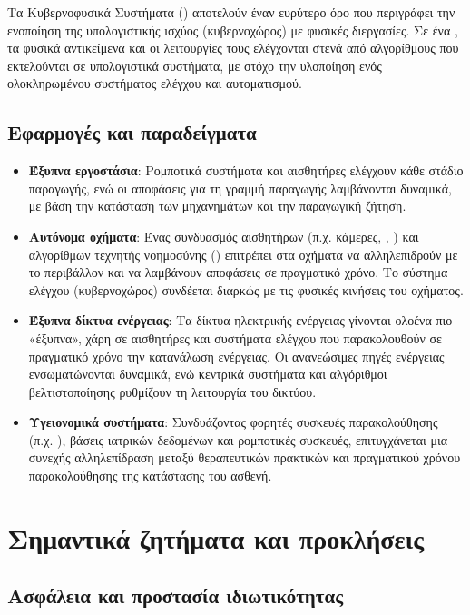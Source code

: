 Τα Κυβερνοφυσικά Συστήματα () αποτελούν έναν ευρύτερο όρο που περιγράφει την ενοποίηση της υπολογιστικής ισχύος (κυβερνοχώρος) με φυσικές διεργασίες. Σε ένα , τα φυσικά αντικείμενα και οι λειτουργίες τους ελέγχονται στενά από αλγορίθμους που εκτελούνται σε υπολογιστικά συστήματα, με στόχο την υλοποίηση ενός ολοκληρωμένου συστήματος ελέγχου και αυτοματισμού.

\subsection{Εφαρμογές και παραδείγματα }

\begin{itemize}
  \item \textbf{Έξυπνα εργοστάσια}: Ρομποτικά συστήματα και αισθητήρες ελέγχουν κάθε στάδιο παραγωγής, ενώ οι αποφάσεις για τη γραμμή παραγωγής λαμβάνονται δυναμικά, με βάση την κατάσταση των μηχανημάτων και την παραγωγική ζήτηση.
  \item \textbf{Αυτόνομα οχήματα}: Ένας συνδυασμός αισθητήρων (π.χ. κάμερες, , ) και αλγορίθμων τεχνητής νοημοσύνης () επιτρέπει στα οχήματα να αλληλεπιδρούν με το περιβάλλον και να λαμβάνουν αποφάσεις σε πραγματικό χρόνο. Το σύστημα ελέγχου (κυβερνοχώρος) συνδέεται διαρκώς με τις φυσικές κινήσεις του οχήματος.
  \item \textbf{Έξυπνα δίκτυα ενέργειας}: Τα δίκτυα ηλεκτρικής ενέργειας γίνονται ολοένα πιο «έξυπνα», χάρη σε αισθητήρες και συστήματα ελέγχου που παρακολουθούν σε πραγματικό χρόνο την κατανάλωση ενέργειας. Οι ανανεώσιμες πηγές ενέργειας ενσωματώνονται δυναμικά, ενώ κεντρικά συστήματα και αλγόριθμοι βελτιστοποίησης ρυθμίζουν τη λειτουργία του δικτύου.
  \item \textbf{Υγειονομικά συστήματα}: Συνδυάζοντας φορητές συσκευές παρακολούθησης (π.χ. ), βάσεις ιατρικών δεδομένων και ρομποτικές συσκευές, επιτυγχάνεται μια συνεχής αλληλεπίδραση μεταξύ θεραπευτικών πρακτικών και πραγματικού χρόνου παρακολούθησης της κατάστασης του ασθενή.
\end{itemize}

\section{Σημαντικά ζητήματα και προκλήσεις}

\subsection{Ασφάλεια και προστασία ιδιωτικότητας}

